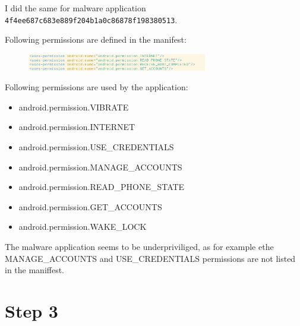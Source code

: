 \documentclass[10pt,a4paper]{article}
\begin{document}
I did the same for malware application
\texttt{4f4ee687c683e889f204b1a0c86878f198380513}.

Following permissions are defined in the manifest:

\begin{figure}[h]
  \includegraphics[width=0.7\textwidth]{manifest2}
\end{figure}

Following permissions are used by the application:
\begin{itemize}
  \item android.permission.VIBRATE
  \item android.permission.INTERNET
  \item android.permission.USE\_CREDENTIALS
  \item android.permission.MANAGE\_ACCOUNTS
  \item android.permission.READ\_PHONE\_STATE
  \item android.permission.GET\_ACCOUNTS
  \item android.permission.WAKE\_LOCK
\end{itemize}

The malware application seems to be underpriviliged, as for example ethe
MANAGE\_ACCOUNTS and USE\_CREDENTIALS permissions are not listed in the
maniffest.


\section{Step 3}
\end{document}
